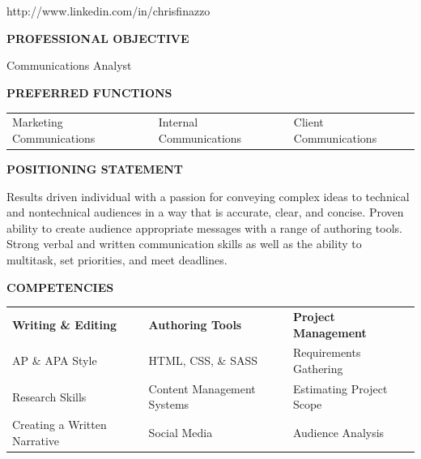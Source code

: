 \documentclass[letterpaper,11pt]{article}
\begin{document}
\begin{center}
\textbf
{\small{\myname}} \\
\end{center}
\begin{raggedleft}
\noindent {\myphone}
\end{raggedleft}
\hfill \hfill {\myemail}\\
\begin{raggedright}
{http://www.linkedin.com/in/chrisfinazzo}
\end{raggedright}
\begin{center}
\textbf
{PROFESSIONAL OBJECTIVE}
\end{center}
\begin{center}
Communications Analyst
\end{center}
\noindent
\begin{center}
\textbf{PREFERRED FUNCTIONS}
\end{center}
\begin{center}
\begin{tabular}{lll}
Marketing Communications & Internal Communications & Client Communications\\
\end{tabular}
\end{center}
\begin{center}
\textbf{POSITIONING STATEMENT}\\
\end{center}
\begin{raggedright}
Results driven individual with a passion for conveying complex ideas to technical and nontechnical audiences in a way that is accurate, clear, and concise. Proven ability to create audience appropriate messages with a range of authoring tools. Strong verbal and written communication skills as well as the ability to multitask, set priorities, and meet deadlines.\\
\end{raggedright}
\begin{center}
\textbf{COMPETENCIES}
\end{center}
\begin{center}
\begin{tabular}{lll}
\textbf{Writing \& Editing} & \textbf{Authoring Tools} & \textbf{Project Management}\\
AP \& APA Style & HTML, CSS, \& SASS & Requirements Gathering\\
Research Skills & Content Management Systems & Estimating Project Scope\\
Creating a Written Narrative & Social Media & Audience Analysis\\
\end{tabular}
\end{center}
\end{document}
